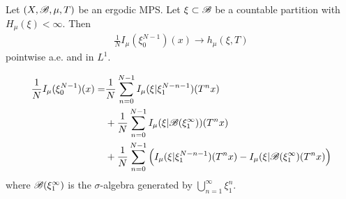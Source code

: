 \documentclass[10pt,a4paper]{report}
\newenvironment{proof}
{\begin{changemargin}{1cm}{0.5cm} 
	}%
	{\end{changemargin}
}
\begin{document}
\thm Let $(X,\mathscr{B}, \mu, T)$ be an ergodic MPS. Let $\xi \subset \mathscr{B}$ be a countable partition with $H_{\mu}(\xi) < \infty$. Then
\begin{align*}
\frac{1}{N} I_{\mu}(\xi_0^{N-1})(x) \rightarrow h_{\mu}(\xi, T)
\end{align*}
pointwise a.e. and in $L^1$.
\begin{proof}
\pf
\begin{align*}
\frac{1}{N} I_{\mu}(\xi_{0}^{N-1})(x) = &\frac{1}{N} \sum_{n=0}^{N-1} I_{\mu} (\xi | \xi_1^{N-n-1}) (T^n x) \\
& + \frac{1}{N}\sum_{n=0}^{N-1} I_{\mu}(\xi | \mathscr{B}(\xi_1^{\infty}))(T^n x) \\
& + \frac{1}{N} \sum_{n=0}^{N-1} \Big( I_{\mu}(\xi | \xi_1^{N-n-1})(T^n x) - I_{\mu}(\xi | \mathscr{B}(\xi_1^{\infty})(T^n x) \Big)
\end{align*}
where $\mathscr{B}(\xi_1^{\infty})$ is the $\sigma$-algebra generated by $\bigcup_{n=1}^{\infty} \xi_1^n$.


\end{proof}
\end{document}
